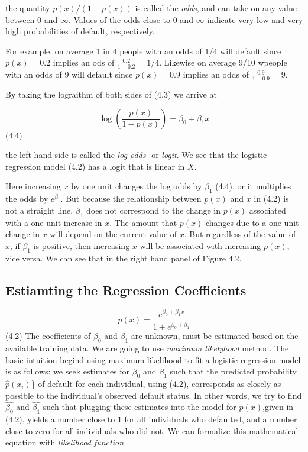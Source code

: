 \documentclass[
  letterpaper,
  DIV=11,
  numbers=noendperiod]{scrreprt}
\begin{document}
the quantity \(p(x)/(1 - p(x))\) is called the \emph{odds}, and can take
on any value between 0 and \(\infty\). Values of the odds close to 0 and
\(\infty\) indicate very low and very high probabilities of default,
respectively.

For example, on average 1 in 4 people with an odds of 1/4 will default
since \(p(x) = 0.2\) implies an ods of \(\frac{0.2}{1-0.2} = 1/4\).
Likewise on average 9/10 wpeople with an odds of 9 will default since
\(p(x) = 0.9\) implies an odds of \(\frac{0.9}{1-0.9} = 9\).

By taking the lograithm of both sides of (4.3) we arrive at

\[
\log(\frac{p(x)}{1-p(x)}) = \beta_0 + \beta_1 x
\] (4.4)

the left-hand side is called the \emph{log-odds-} or \emph{logit}. We
see that the logistic regression model (4.2) has a logit that is linear
in \(X\).

Here increasing \(x\) by one unit changes the log odds by \(\beta_1\)
(4.4), or it multiplies the odds by \(e^{\beta_1}\). But because the
relationship between \(p(x)\) and \(x\) in (4.2) is not a straight line,
\(\beta_1\) does not correspond to the change in \(p(x)\) associated
with a one-unit increase in \(x\). The amount that \(p(x)\) changes due
to a one-unit change in \(x\) will depend on the current value of \(x\).
But regardless of the value of \(x\), if \(\beta_1\) is positive, then
increasing \(x\) will be associated with increasing \(p(x)\), vice
versa. We can see that in the right hand panel of Figure 4.2.

\hypertarget{estiamting-the-regression-coefficients}{%
\subsection{Estiamting the Regression
Coefficients}\label{estiamting-the-regression-coefficients}}

\[
p(x) = \frac{e^{\beta_0 + \beta_1 x}}{1 + e^{\beta_0 + \beta_1}}
\] (4.2) The coefficients of \(\beta_0\) and \(\beta_1\) are unknown,
must be estimated based on the available training data. We are going to
use \emph{maximum likelyhood} method. The basic intuition begind using
maximum likelihood to fit a logistic regression model is as follows: we
seek estimates for \(\beta_0\) and \(\beta_1\) such that the predicted
probability \(\hat{p}(x_i)\)\} of default for each individual, using
(4.2), corresponds as closely as possible to the individual's observed
default status. In other words, we try to find \(\hat{\beta_0}\) and
\(\hat{\beta_1}\) such that plugging these estimates into the model for
\(p(x)\),given in (4.2), yields a number close to 1 for all individuals
who defaulted, and a number close to zero for all individuals who did
not. We can formalize this mathematical equation with \emph{likelihood
function}
\end{document}
